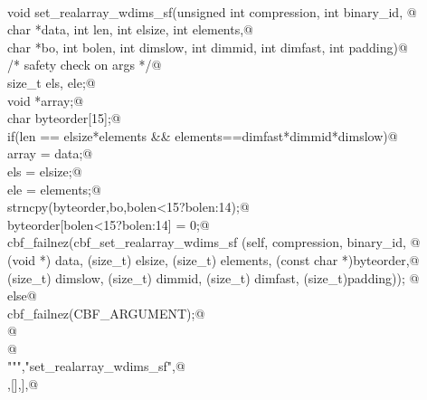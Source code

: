 \documentclass[10pt,a4paper,twoside,notitlepage]{article}
\begin{document}
\begin{flushleft}
\begin{minipage}{\linewidth}
\begin{list}{}{}
\mbox{}\verb@%apply (char *STRING, int LENGTH) { (char *data, int len) } set_realarray_wdims_sf;@\\
\mbox{}\verb@%apply (char *STRING, int LENGTH) { (char *bo, int bolen) } set_realarray_wdims_sf;@\\
\mbox{}\verb@@\\
\mbox{}\verb@    void set_realarray_wdims_sf(unsigned int compression, int binary_id, @\\
\mbox{}\verb@             char *data, int len, int elsize, int elements,@\\
\mbox{}\verb@             char *bo, int bolen, int dimslow, int dimmid, int dimfast, int padding){@\\
\mbox{}\verb@        /* safety check on args */@\\
\mbox{}\verb@        size_t els, ele;@\\
\mbox{}\verb@        void *array;@\\
\mbox{}\verb@        char byteorder[15];@\\
\mbox{}\verb@        if(len == elsize*elements && elements==dimfast*dimmid*dimslow){@\\
\mbox{}\verb@           array = data;@\\
\mbox{}\verb@           els = elsize;@\\
\mbox{}\verb@           ele = elements;@\\
\mbox{}\verb@           strncpy(byteorder,bo,bolen<15?bolen:14);@\\
\mbox{}\verb@           byteorder[bolen<15?bolen:14] = 0;@\\
\mbox{}\verb@           cbf_failnez(cbf_set_realarray_wdims_sf (self, compression, binary_id, @\\
\mbox{}\verb@           (void *) data,  (size_t) elsize, (size_t) elements, (const char *)byteorder,@\\
\mbox{}\verb@           (size_t) dimslow, (size_t) dimmid, (size_t) dimfast, (size_t)padding)); @\\
\mbox{}\verb@        }else{@\\
\mbox{}\verb@           cbf_failnez(CBF_ARGUMENT);@\\
\mbox{}\verb@        }@\\
\mbox{}\verb@    }@\\
\mbox{}\verb@""","set_realarray_wdims_sf",@\\
\mbox{},[],],@\\

\end{list}
\end{minipage}
\end{flushleft}
\end{document}
